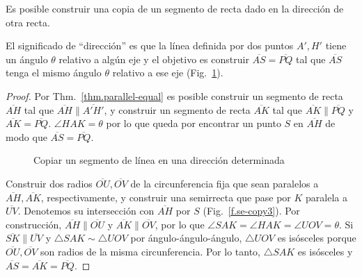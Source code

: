 \begin{theorem}\label{thm.straight-direction}
Es posible construir una copia de un segmento de recta dado en la dirección de otra recta.
\end{theorem}

El significado de ``dirección'' es que la línea definida por dos puntos $A',H'$ tiene un ángulo $\theta$ relativo a algún eje y el objetivo es construir $\overline{AS}=\overline{PQ}$ tal que $\overline{AS}$ tenga el mismo ángulo $\theta$ relativo a ese eje (Fig.~\ref{f.se-copy1}).

\begin{proof}
Por Thm.~\ref{thm.parallel-equal} es posible construir un segmento de recta $\overline{AH}$ tal que $\overline{AH}\parallel\overline{A'H'}$, y construir un segmento de recta $\overline{AK}$ tal que $\overline{AK}\parallel\overline{PQ}$ y $\overline{AK}=\overline{PQ}$.
$\angle HAK=\theta$ por lo que queda por encontrar un punto $S$ en $\overline{AH}$ de modo que $\overline{AS}=\overline{PQ}$.

\begin{figure}[t]
\begin{center}
\end{center}
\caption{Copiar un segmento de línea en una dirección determinada}\label{f.se-copy1}
\end{figure}

Construir dos radios $\overline{OU}, \overline{OV}$ de la circunferencia fija que sean paralelos a $\overline{AH}, \overline{AK}$, respectivamente, y construir una semirrecta que pase por $K$ paralela a $\overline{UV}$. Denotemos su intersección con $\overline{AH}$ por $S$ (Fig.~\ref{f.se-copy3}). Por construcción, $\overline{AH}\parallel\overline{OU}$ y $\overline{AK}\parallel\overline{OV}$, por lo que $\angle SAK=\angle HAK=\angle UOV=\theta$. Si $\overline{SK}\parallel\overline{UV}$ y $\triangle SAK\sim\triangle UOV$ por ángulo-ángulo-ángulo, $\triangle UOV$ es isósceles porque $\overline{OU}, \overline{OV}$ son radios de la misma circunferencia. Por lo tanto, $\triangle SAK$ es isósceles y $\overline{AS}=\overline{AK}=\overline{PQ}$.
\end{proof}

